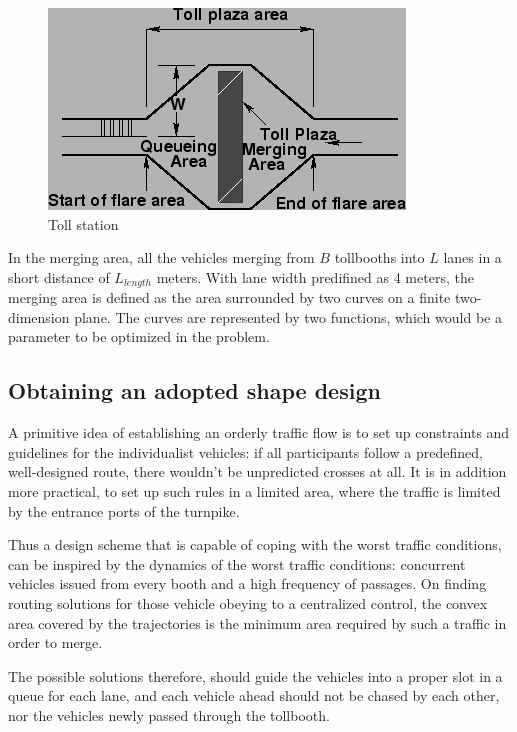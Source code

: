 \documentclass{mcmthesis}
\begin{document}
\begin{figure}[H]
	\small
	\centering
	\caption{Toll station \cite{note}} \label{fig:Ts}
	\includegraphics{img3.png}
\end{figure}

In the merging area, all the vehicles merging from $B$ tollbooths into $L$ lanes in a short distance of $L_{length}$ meters.
With lane width predifined as 4 meters, the merging area is defined as the area surrounded by two curves on a finite two-dimension plane. The curves are represented by two functions, which would be a parameter to be optimized in the problem.

\subsection{Obtaining an adopted shape design}

A primitive idea of establishing an orderly traffic flow is to set up constraints and guidelines for the individualist vehicles: if all participants follow a predefined, well-designed route, there wouldn't be unpredicted crosses at all. It is in addition more practical, to set up such rules in a limited area, where the traffic is limited by the entrance ports of the turnpike.

Thus a design scheme that is capable of coping with the worst traffic conditions, can be inspired by the dynamics of the worst traffic conditions: concurrent vehicles issued from every booth and a high frequency of passages. On finding routing solutions for those vehicle obeying to a centralized control, the convex area covered by the trajectories is the minimum area required by such a traffic in order to merge.

The possible solutions therefore, should guide the vehicles into a proper slot in a queue for each lane, and each vehicle ahead should not be chased by each other, nor the vehicles newly passed through the tollbooth.
\end{document}
